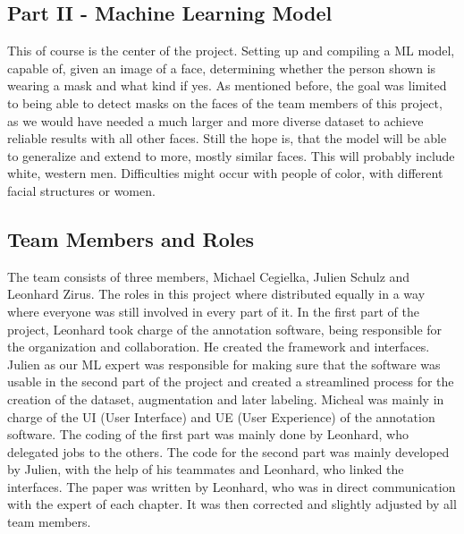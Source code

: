 \subsection{Part II - Machine Learning Model}

This of course is the center of the project. Setting up and compiling a ML
model, capable of, given an image of a face, determining whether the
person shown is wearing a mask and what kind if yes.
\newline
As mentioned before, the goal was limited to being able to detect masks on the
faces of the team members of this project, as we would have needed a much larger
and more diverse dataset to achieve reliable results with all other faces. Still
the hope is, that the model will be able to generalize and extend to more, 
mostly similar faces. This will probably include white, western
men. Difficulties might occur with people of color, with different facial structures or women.

\subsection{Team Members and Roles}

The team consists of three members, Michael Cegielka, Julien Schulz and Leonhard
Zirus. The roles in this project where distributed equally in a way where
everyone was still involved in every part of it. 
\newline
In the first part of the project, Leonhard took charge of the annotation
software, being responsible for the organization and collaboration. He created
the framework and interfaces. Julien as our ML expert was responsible for making
sure that the software was usable in the second part of the project and created
a streamlined process for the creation of the dataset, augmentation and later
labeling. Micheal was mainly in charge of the UI (User Interface) and UE (User
Experience) of the annotation software. 
\newline
The coding of the first part was mainly done by Leonhard, who delegated jobs to the others.
The code for the second part was mainly developed by Julien, with the help of his teammates
and Leonhard, who linked the interfaces.
The paper was written by Leonhard, who was in direct communication with the expert of
each chapter. It was then corrected and slightly adjusted by all team members.